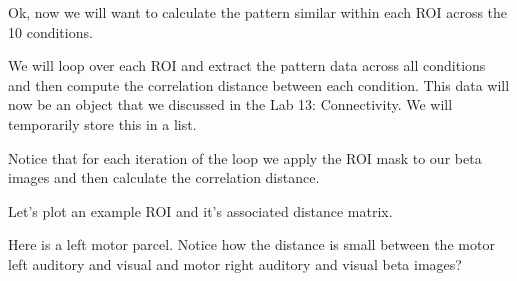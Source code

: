 \documentclass[letterpaper,10pt,english]{sphinxmanual}
\begin{document}
\noindent{}

Ok, now we will want to calculate the pattern similar within each ROI across the 10 conditions.

We will loop over each ROI and extract the pattern data across all conditions and then compute the correlation distance between each condition. This data will now be an  object that we discussed in the Lab 13: Connectivity. We will temporarily store this in a list.

Notice that for each iteration of the loop we apply the ROI mask to our beta images and then calculate the correlation distance.

\begin{sphinxVerbatim}[commandchars=\\\{\}]
  \PYG{p}{[}\PYG{p}{]}
   
\end{sphinxVerbatim}

Let’s plot an example ROI and it’s associated distance matrix.

Here is a left motor parcel. Notice how the distance is small between the motor left auditory and visual and motor right auditory and visual beta images?

\begin{sphinxVerbatim}[commandchars=\\\{\}]
  
\PYG{p}{[}\PYG{p}{]}
\PYG{p}{[}\PYG{p}{]}  
  \PYG{p}{[}\PYG{p}{]}  
\end{sphinxVerbatim}

\noindent{}
\end{document}
